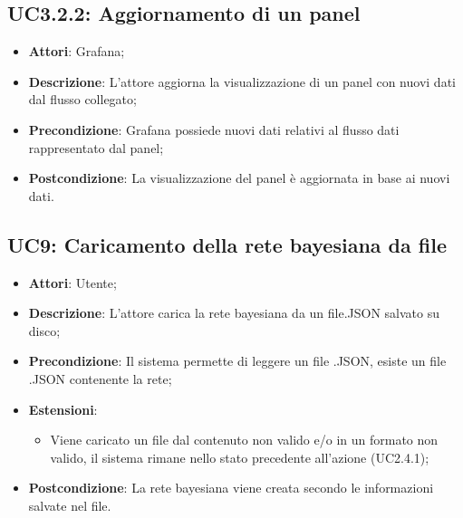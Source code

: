 \subsection{UC3.2.2: Aggiornamento di un panel}
\hypertarget{UC3.2.2}{}
\begin{itemize}
	\item \textbf{Attori}: Grafana;
	\item \textbf{Descrizione}: L'attore aggiorna la visualizzazione di un panel con nuovi dati dal flusso collegato;
	\item \textbf{Precondizione}: Grafana possiede nuovi dati relativi al flusso dati rappresentato dal panel;
	\item \textbf{Postcondizione}: La visualizzazione del panel è aggiornata in base ai nuovi dati.
\end{itemize}

\subsection{UC9: Caricamento della rete bayesiana da file}
\hypertarget{UC9}{}
\begin{itemize}
	\item \textbf{Attori}: Utente;
	\item \textbf{Descrizione}: L'attore carica la rete bayesiana da un file.JSON salvato su disco;
	\item \textbf{Precondizione}: Il sistema permette di leggere un file .JSON, esiste un file .JSON contenente la rete;
	\item \textbf{Estensioni}:
	\begin{itemize}
		\item Viene caricato un file dal contenuto non valido e/o in un formato non valido, il sistema rimane nello stato precedente all'azione (UC2.4.1);
	\end{itemize}
	\item \textbf{Postcondizione}: La rete bayesiana viene creata secondo le informazioni salvate nel file.
\end{itemize}